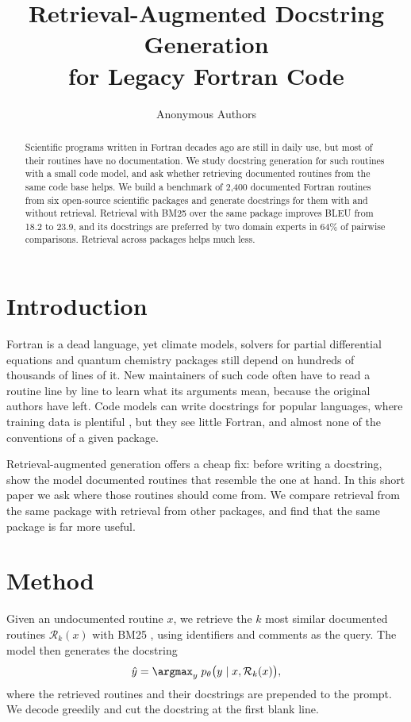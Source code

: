 \documentclass{article}
\title{Retrieval-Augmented Docstring Generation \\ for Legacy Fortran Code}
\author{Anonymous Authors}
\begin{document}
\maketitle

\begin{abstract}
Scientific programs written in Fortran decades ago are still in daily use, but most of their routines have no documentation.
We study docstring generation for such routines with a small code model, and ask whether retrieving documented routines from the same code base helps.
We build a benchmark of 2,400 documented Fortran routines from six open-source scientific packages and generate docstrings for them with and without retrieval.
Retrieval with BM25 over the same package improves BLEU from 18.2 to 23.9, and its docstrings are preferred by two domain experts in 64\% of pairwise comparisons.
Retrieval across packages helps much less.
\end{abstract}

\section{Introduction}
\label{sec:intro}

Fortran is a dead language, yet climate models, solvers for partial differential equations and quantum chemistry packages still depend on hundreds of thousands of lines of it.
New maintainers of such code often have to read a routine line by line to learn what its arguments mean, because the original authors have left.
Code models can write docstrings for popular languages, where training data is plentiful \citep{husain2019codesearchnet}, but they see little Fortran, and almost none of the conventions of a given package.

Retrieval-augmented generation \citep{lewis2020retrieval} offers a cheap fix: before writing a docstring, show the model documented routines that resemble the one at hand.
In this short paper we ask where those routines should come from.
We compare retrieval from the same package with retrieval from other packages, and find that the same package is far more useful.

\section{Method}
\label{sec:method}

Given an undocumented routine $x$, we retrieve the $k$ most similar documented routines $\mathcal{R}_k(x)$ with BM25 \citep{robertson2009probabilistic}, using identifiers and comments as the query.
The model then generates the docstring
\begin{equation}
\hat{y} = \argmax_{y} \; p_\theta\bigl(y \mid x, \mathcal{R}_k(x)\bigr),
\label{eq:rag}
\end{equation}
where the retrieved routines and their docstrings are prepended to the prompt.
We decode greedily and cut the docstring at the first blank line.
\end{document}
